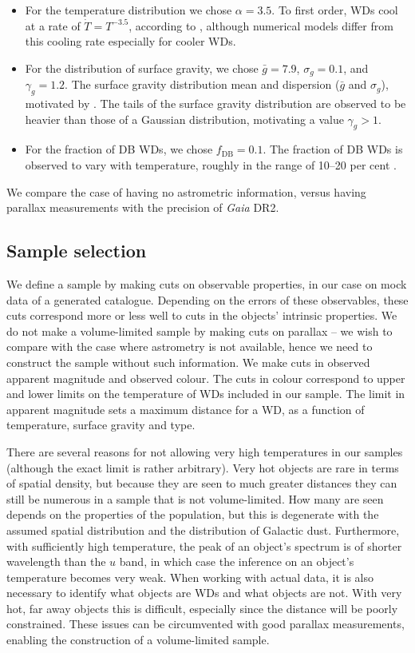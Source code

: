\documentclass[fleqn,usenatbib]{mnras}
\newcommand{\Teff}{T}
\begin{document}
\begin{itemize}
	\item For the temperature distribution we chose $\alpha=3.5$. To first order, WDs cool at a rate of $\dot{\Teff} = \Teff^{-3.5}$, according to \cite{1952MNRAS.112..583M}, although numerical models differ from this cooling rate especially for cooler WDs.
	\item For the distribution of surface gravity, we chose $\bar{g}=7.9$, $\sigma_g=0.1$, and $\gamma_g=1.2$. The surface gravity distribution mean and dispersion ($\bar{g}$ and $\sigma_g$), motivated by \cite{2006ApJS..167...40E}. The tails of the surface gravity distribution are observed to be heavier than those of a Gaussian distribution, motivating a value $\gamma_g>1$.
	\item For the fraction of DB WDs, we chose $f_\text{DB}=0.1$. The fraction of DB WDs is observed to vary with temperature, roughly in the range of 10--20 per cent \citep{2011ApJ...737...28B}.
\end{itemize}

We compare the case of having no astrometric information, versus having parallax measurements with the precision of \emph{Gaia} DR2.

\subsection{Sample selection}\label{sec:sample_cuts}

We define a sample by making cuts on observable properties, in our case on mock data of a generated catalogue. Depending on the errors of these observables, these cuts correspond more or less well to cuts in the objects' intrinsic properties. We do not make a volume-limited sample by making cuts on parallax -- we wish to compare with the case where astrometry is not available, hence we need to construct the sample without such information. We make cuts in observed apparent magnitude and observed colour. The cuts in colour correspond to upper and lower limits on the temperature of WDs included in our sample. The limit in apparent magnitude sets a maximum distance for a WD, as a function of temperature, surface gravity and type.

There are several reasons for not allowing very high temperatures in our samples (although the exact limit is rather arbitrary). Very hot objects are rare in terms of spatial density, but because they are seen to much greater distances they can still be numerous in a sample that is not volume-limited. How many are seen depends on the properties of the population, but this is degenerate with the assumed spatial distribution and the distribution of Galactic dust. Furthermore, with sufficiently high temperature, the peak of an object's spectrum is of shorter wavelength than the $u$ band, in which case the inference on an object's temperature becomes very weak. When working with actual data, it is also necessary to identify what objects are WDs and what objects are not. With very hot, far away objects this is difficult, especially since the distance will be poorly constrained. These issues can be circumvented with good parallax measurements, enabling the construction of a volume-limited sample.
\end{document}
